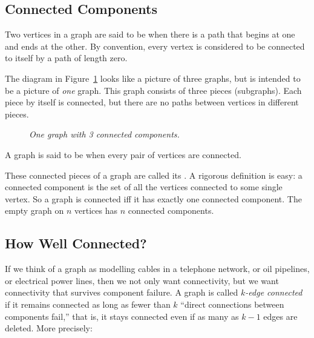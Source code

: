 \subsection{Connected Components}
\begin{definition}
  Two vertices in a graph are said to be  when there is a
  path that begins at one and ends at the other.  By convention, every
  vertex is considered to be connected to itself by a path of length zero.
\end{definition}

The diagram in Figure~\ref{fig:3comp} looks like a picture of three
graphs, but is intended to be a picture of \emph{one} graph.  This graph
consists of three pieces (subgraphs).  Each piece by itself is connected,
but there are no paths between vertices in different pieces.

\begin{figure}[htbp] 
\caption{\em One graph with 3 connected components.}
\label{fig:3comp}
\end{figure}

\begin{definition}\label{def:connected-graph}
A graph is said to be  when every pair of vertices are
connected.
\end{definition}
These connected pieces of a graph are called its .  A rigorous definition is easy: a connected component is the
set of all the vertices connected to some single vertex.  So a graph is
connected iff it has exactly one connected component.  The empty graph on
$n$ vertices has $n$ connected components.

\subsection{How Well Connected?}
If we think of a graph as modelling cables in a telephone network, or oil
pipelines, or electrical power lines, then we not only want connectivity,
but we want connectivity that survives component failure.  A graph is
called \emph{$k$-edge connected} if it remains connected as long as fewer
than $k$ ``direct connections between components fail,'' that is, it stays
connected even if as many as $k-1$ edges are deleted.  More precisely:

